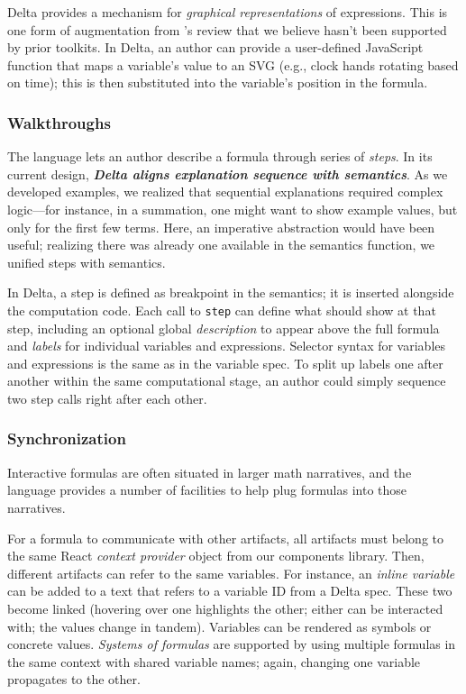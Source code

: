 Delta provides a mechanism for \emph{graphical representations} of expressions. This is one form of augmentation from \citet{Head2022-ws}'s review that we believe hasn't been supported by prior toolkits. In Delta, an author can provide a user-defined JavaScript function that maps a variable's value to an SVG (e.g., clock hands rotating based on time); this is then substituted into the variable's position in the formula.

\subsubsection{Walkthroughs} The language lets an author describe a formula through series of \emph{steps}. In its current design, \textbf{\textit{Delta aligns explanation sequence with semantics}}. As we developed examples, we realized that sequential explanations required complex logic---for instance, in a summation, one might want to show example values, but only for the first few terms. Here, an imperative abstraction would have been useful; realizing there was already one available in the semantics function, we unified steps with semantics.

In Delta, a step is defined as breakpoint in the semantics; it is inserted alongside the computation code. Each call to \texttt{step} can define what should show at that step, including an optional global \emph{description} to appear above the full formula and \emph{labels} for individual variables and expressions. Selector syntax for variables and expressions is the same as in the variable spec. To split up labels one after another within the same computational stage, an author could simply sequence two step calls right after each other.

\subsubsection{Synchronization}\label{Synchronization}
Interactive formulas are often situated in larger math narratives, and the language provides a number of facilities to help plug formulas into those narratives.

For a formula to communicate with other artifacts, all artifacts must belong to the same React \emph{context provider} object from our components library. Then, different artifacts can refer to the same variables. For instance, an \textit{inline variable} can be added to a text that refers to a variable ID from a Delta spec. These two become linked (hovering over one highlights the other; either can be interacted with; the values change in tandem). Variables can be rendered as symbols or concrete values. \emph{Systems of formulas} are supported by using multiple formulas in the same context with shared variable names; again, changing one variable propagates to the other.

